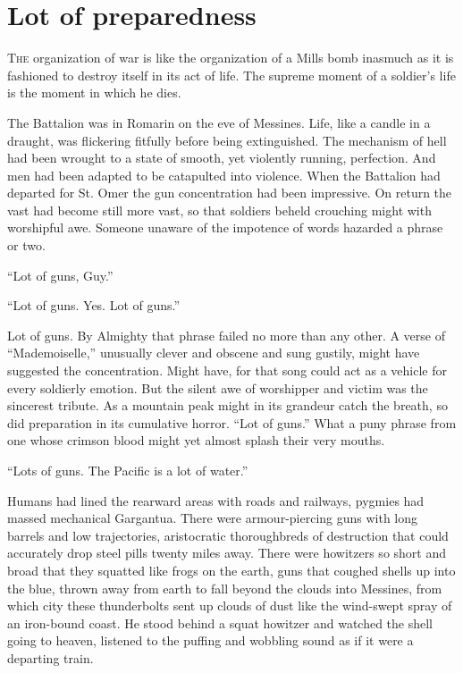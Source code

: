 \chapter*{\textsf{Lot of preparedness}}

T\textsc{he} organization of war is like the organization of a Mills bomb inasmuch as it is fashioned to destroy itself in its act of life. The supreme moment of a soldier's life is the moment in which he dies.

The Battalion was in Romarin on the eve of Messines. Life, like a candle in a draught, was flickering fitfully before being extinguished. The mechanism of hell had been wrought to a state of smooth, yet violently running, perfection. And men had been adapted to be catapulted into violence. When the Battalion had departed for St. Omer the gun concentration had been impressive. On return the vast had become still more vast, so that soldiers beheld crouching might with worshipful awe. Someone unaware of the impotence of words hazarded a phrase or two.

``Lot of guns, Guy.''

``Lot of guns. Yes. Lot of guns.''

Lot of guns. By Almighty that phrase failed no more than any other. A verse of ``Mademoiselle,'' unusually clever and obscene and sung gustily, might have suggested the concentration. Might have, for that song could act as a vehicle for every soldierly emotion. But the silent awe of worshipper and victim was the sincerest tribute. As a mountain peak might in its grandeur catch the breath, so did preparation in its cumulative horror. ``Lot of guns.'' What a puny phrase from one whose crimson blood might yet almost splash their very mouths.

``Lots of guns. The Pacific is a lot of water.''

Humans had lined the rearward areas with roads and railways, pygmies had massed mechanical Gargantua. There were armour-piercing guns with long barrels and low trajectories, aristocratic thoroughbreds of destruction that could accurately drop steel pills twenty miles away. There were howitzers so short and broad that they squatted like frogs on the earth, guns that coughed shells up into the blue, thrown away from earth to fall beyond the clouds into Messines, from which city these thunderbolts sent up clouds of dust like the wind-swept spray of an iron-bound coast. He stood behind a squat howitzer and watched the shell going to heaven, listened to the puffing and wobbling sound as if it were a departing train.

